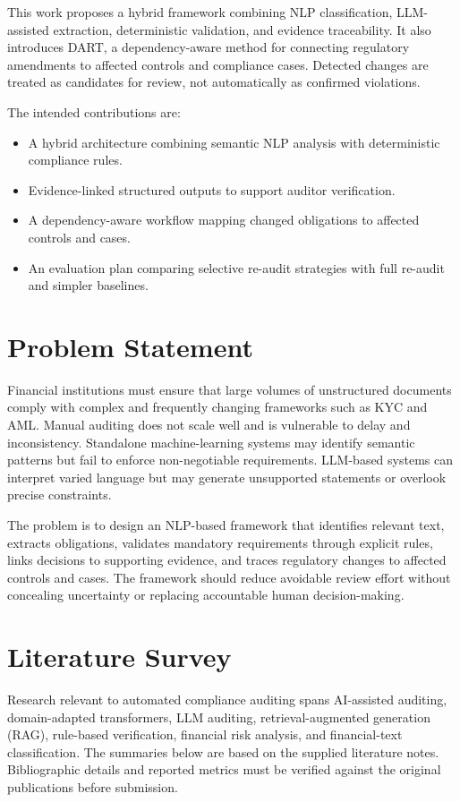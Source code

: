 \documentclass[conference]{IEEEtran}
\begin{document}
This work proposes a hybrid framework combining NLP classification, LLM-assisted extraction, deterministic validation, and evidence traceability. It also introduces DART, a dependency-aware method for connecting regulatory amendments to affected controls and compliance cases. Detected changes are treated as candidates for review, not automatically as confirmed violations.

The intended contributions are:
\begin{itemize}
\item A hybrid architecture combining semantic NLP analysis with deterministic compliance rules.
\item Evidence-linked structured outputs to support auditor verification.
\item A dependency-aware workflow mapping changed obligations to affected controls and cases.
\item An evaluation plan comparing selective re-audit strategies with full re-audit and simpler baselines.
\end{itemize}

\section{Problem Statement}
Financial institutions must ensure that large volumes of unstructured documents comply with complex and frequently changing frameworks such as KYC and AML. Manual auditing does not scale well and is vulnerable to delay and inconsistency. Standalone machine-learning systems may identify semantic patterns but fail to enforce non-negotiable requirements. LLM-based systems can interpret varied language but may generate unsupported statements or overlook precise constraints.

The problem is to design an NLP-based framework that identifies relevant text, extracts obligations, validates mandatory requirements through explicit rules, links decisions to supporting evidence, and traces regulatory changes to affected controls and cases. The framework should reduce avoidable review effort without concealing uncertainty or replacing accountable human decision-making.

\section{Literature Survey}
Research relevant to automated compliance auditing spans AI-assisted auditing, domain-adapted transformers, LLM auditing, retrieval-augmented generation (RAG), rule-based verification, financial risk analysis, and financial-text classification. The summaries below are based on the supplied literature notes. Bibliographic details and reported metrics must be verified against the original publications before submission.
\end{document}
